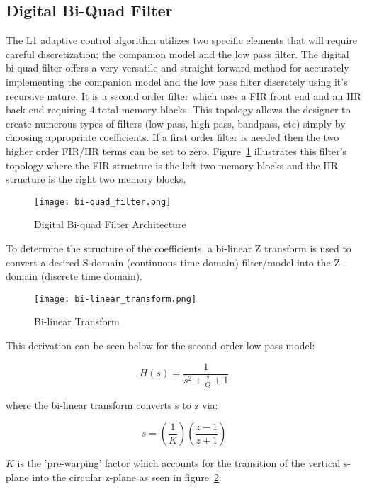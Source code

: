 \subsection{Digital Bi-Quad Filter}

The L1 adaptive control algorithm utilizes two specific elements that will require careful discretization; the companion model and the low pass filter.  The digital bi-quad filter offers a very versatile and straight forward method for accurately implementing the companion model and the low pass filter discretely using it's recursive nature.  It is a second order filter which uses a \ac{FIR} front end and an \ac{IIR} back end requiring 4 total memory blocks.  This topology allows the designer to create numerous types of filters (low pass, high pass, bandpass, etc) simply by choosing appropriate coefficients.  If a first order filter is needed then the two higher order FIR/IIR terms can be set to zero.  Figure~\ref{fig:bi-quad} illustrates this filter's topology where the \ac{FIR} structure is the left two memory blocks and the \ac{IIR} structure is the right two memory blocks.

\begin{figure}[h!]
 \centering
  \texttt{[image: bi-quad\_filter.png]}
  \caption{Digital Bi-quad Filter Architecture }
  \label{fig:bi-quad}
\end{figure}

To determine the structure of the coefficients, a bi-linear Z transform is used to convert a desired S-domain (continuous time domain) filter/model into the Z-domain (discrete time domain).  

\begin{figure}[h!]
 \centering
  \texttt{[image: bi-linear\_transform.png]}
  \caption{Bi-linear Transform}
  \label{fig:bi-linear_transform}
\end{figure}

This derivation can be seen below for the second order low pass model:

\begin{equation}
	H(s) = \frac{1}{s^2+\frac{s}{Q}+1}
\end{equation}

where the bi-linear transform converts s to z via:

\begin{equation}
	s = \left(\frac{1}{K}\right)\left(\frac{z-1}{z+1}\right)
\end{equation}

$K$ is the 'pre-warping' factor which accounts for the transition of the vertical s-plane into the circular z-plane as seen in figure~\ref{fig:bi-linear_transform}.

